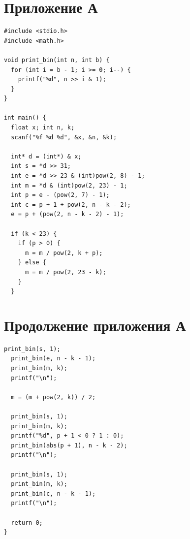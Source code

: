 \documentclass[a4paper,14pt]{extarticle}
\begin{document}
  \section*{Приложение А}
  \begin{lstlisting}[tabsize=2,basicstyle=\ttfamily]
#include <stdio.h>
#include <math.h>

void print_bin(int n, int b) {
  for (int i = b - 1; i >= 0; i--) {
    printf("%d", n >> i & 1);
  }
}

int main() {
  float x; int n, k;
  scanf("%f %d %d", &x, &n, &k);
  
  int* d = (int*) & x;
  int s = *d >> 31;
  int e = *d >> 23 & (int)pow(2, 8) - 1;
  int m = *d & (int)pow(2, 23) - 1;
  int p = e - (pow(2, 7) - 1);
  int c = p + 1 + pow(2, n - k - 2);
  e = p + (pow(2, n - k - 2) - 1);
  
  if (k < 23) {
    if (p > 0) {
      m = m / pow(2, k + p);
    } else {
      m = m / pow(2, 23 - k);
    }
  }
  \end{lstlisting}

  \pagebreak
  \section*{Продолжение приложения А}
  \begin{lstlisting}[tabsize=2,basicstyle=\ttfamily]
  print_bin(s, 1);
  print_bin(e, n - k - 1);
  print_bin(m, k);
  printf("\n");
  
  m = (m + pow(2, k)) / 2;
  
  print_bin(s, 1);
  print_bin(m, k);
  printf("%d", p + 1 < 0 ? 1 : 0);
  print_bin(abs(p + 1), n - k - 2);
  printf("\n");
  
  print_bin(s, 1);
  print_bin(m, k);
  print_bin(c, n - k - 1);
  printf("\n");
  
  return 0;
}
  \end{lstlisting}
\end{document}

